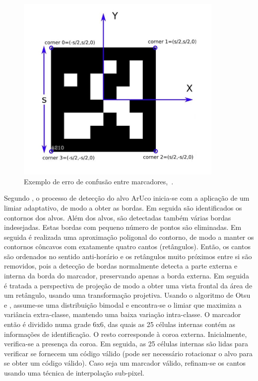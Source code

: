 \begin{figure}[H]
	\centering
	\includegraphics[width=10cm, height=10 cm]{figuras/aruco-identificador.jpg}
	\caption{Exemplo de erro de confusão entre marcadores,~\cite{Salinas2013}.}
	\label{fig:aruco-identificador}
\end{figure}

Segundo \citet{Salinas2013}, o processo de detecção do alvo ArUco inicia-se com a aplicação de um limiar adaptativo, de modo a obter as bordas. Em seguida são identificados os contornos dos alvos. Além dos alvos, são detectadas também várias bordas indesejadas. Estas bordas com pequeno número de pontos são eliminadas. Em seguida é realizada uma aproximação poligonal do contorno, de modo a manter os contornos côncavos com exatamente quatro cantos (retângulos). Então, os cantos são ordenados no sentido anti-horário e os retângulos muito próximos entre si são removidos, pois a detecção de bordas normalmente detecta a parte externa e interna da borda do marcador, preservando apenas a borda externa. Em seguida é tratada a perspectiva de projeção de modo a obter uma vista frontal da área de um retângulo, usando uma transformação projetiva. Usando o algoritmo de Otsu \cite{OTSU1979} e \cite{Artero2000}, assume-se uma distribuição bimodal e encontra-se o limiar que maximiza a variância extra-classe, mantendo uma baixa variação intra-classe. O marcador então é dividido numa grade 6x6, das quais as 25 células internas contém as informações de identificação. O resto corresponde à coroa externa. Inicialmente, verifica-se a presença da coroa. Em seguida, as 25 células internas são lidas para verificar se fornecem um código válido (pode ser necessário rotacionar o alvo para se obter um código válido). Caso seja um marcador válido, refinam-se os cantos usando uma técnica de interpolação sub-pixel.

